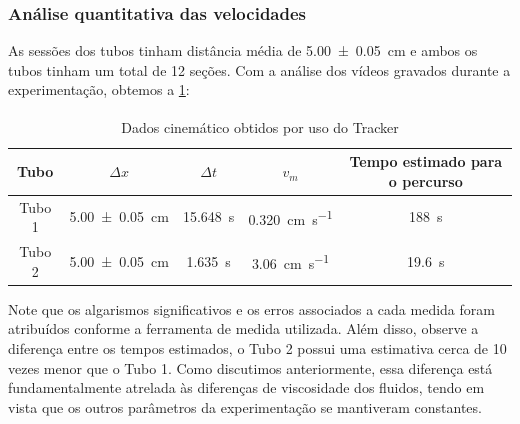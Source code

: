 \subsubsection{Análise quantitativa das velocidades}
    As sessões dos tubos tinham distância média de
    \qty{5.00\pm0.05}{\centi\meter} e ambos os tubos tinham um total de 12
    seções. Com a análise dos vídeos gravados durante a experimentação, obtemos
    a \cref{tab:tubos}:
    \begin{table}[H]
    \caption{Dados cinemático obtidos por uso do
    Tracker\textsuperscript{\textcopyright}}\label{tab:tubos}
    \begin{center}
    \begin{tabular}{c c c c c}
    \hline
    Tubo & \( \Delta x \) & \( \Delta t \) & \( v_m \) & Tempo estimado para o
    percurso \\
    \hline
    Tubo 1 & \qty{5.00\pm0.05}{\centi\meter} & \qty{15.648}{\second} &
    \qty{0.320}{\centi\meter\per\second} & \qty{188}{\second} \\
    Tubo 2 & \qty{5.00\pm0.05}{\centi\meter} & \qty{1.635}{\second} &
    \qty{3.06}{\centi\meter\per\second} & \qty{19.6}{\second} \\
    \hline
    \end{tabular}
    \end{center}
    \end{table}
    Note que os algarismos significativos e os erros associados a cada medida
    foram atribuídos conforme a ferramenta de medida utilizada.  Além disso,
    observe a diferença entre os tempos estimados, o Tubo 2 possui uma
    estimativa cerca de 10 vezes menor que o Tubo 1. Como discutimos
    anteriormente, essa diferença está fundamentalmente atrelada às diferenças
    de viscosidade dos fluidos, tendo em vista que os outros parâmetros da
    experimentação se mantiveram constantes. 

